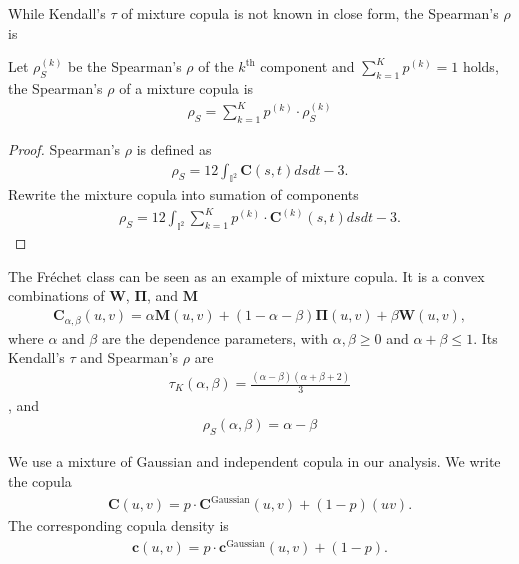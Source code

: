 While Kendall's $\tau$ of mixture copula is not known in close form,
the Spearman's $\rho$ is

\begin{proposition}
    Let $\rho_S^{(k)}$ be the Spearman's $\rho$ of the $k^\text{th}$ component and $\sum_{k=1}^K p^{(k)}=1$ holds,
    the Spearman's $\rho$ of a mixture copula is
    \begin{align}
        \rho_S = \sum_{k=1}^K p^{(k)} \cdot \rho_S^{(k)}
        \end{align}
    \end{proposition}

\begin{proof}
    Spearman's $\rho$ is defined as \citep{Nelsen1999}
    \begin{align}
        \rho_S = 12 \int_{\mathbb{I}^2} \bm{C}(s,t) ds dt - 3.
        \end{align}
    Rewrite the mixture copula into sumation of components
       \begin{align}
        \rho_S = 12 \int_{\mathbb{I}^2} \sum_{k=1}^K p^{(k)} \cdot \bm{C}^{(k)}(s,t) ds dt - 3.
        \end{align}
    \end{proof}

\begin{example}
    The Fr{\'e}chet class can be seen as an example of mixture copula.
    It is a convex combinations of $\bm{W}$, $\bm{\Pi}$, and $\bm{M}$ \citep{Nelsen1999}
    \begin{align}
        \bm{C}_{\alpha, \beta}(u,v)
        = \alpha \bm{M}(u,v) +
        (1-\alpha-\beta)\bm{\Pi}(u,v)
        +\beta \bm{W}(u,v),
        \end{align}
    where $\alpha$ and $\beta$ are the dependence parameters, with $\alpha, \beta \geq 0$ and
    $\alpha+\beta \leq 1$.
    Its Kendall's $\tau$ and Spearman's $\rho$ are
    \begin{align}
        \tau_K(\alpha, \beta) = \frac{(\alpha - \beta)(\alpha+\beta+2)}{3}
        \end{align}
    , and
    \begin{align}
        \rho_S(\alpha, \beta) = \alpha - \beta
        \end{align}
    \end{example}\medskip

We use a mixture of Gaussian and independent copula in our analysis.
We write the copula
\begin{align}
    \bm{C}(u,v) = p\cdot \bm{C}^\text{Gaussian}(u,v) + (1-p)(uv).
    \end{align}
The corresponding copula density is
\begin{align}
    \bm{c}(u,v) = p\cdot \bm{c}^\text{Gaussian}(u,v) + (1-p).
    \end{align}

